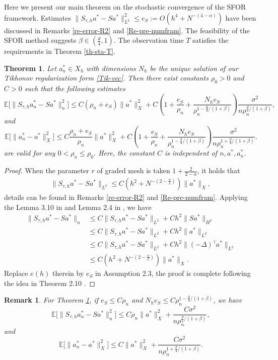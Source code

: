 \documentclass[11pt]{article}
\newtheorem{theorem}{Theorem}
\newtheorem{remark}{Remark}[section]
\numberwithin{equation}{section}
\begin{document}
Here we present our main theorem on the stochastic convergence of the SFOR framework. Estimates $\|S_{\tau,h}a^*-Sa^*\|_{L^2}^2\leq e_S:=O(h^4+N^{-(4-\alpha)})$ have been discussed in Remarks \ref{re-error-R2} and \ref{Re-pre-numfram}. 
The feasibility of the SFOR method suggests $\beta\in(\frac{d}{4},1)$. The observation time $T$ satisfies the requirements in Theorem \ref{th-sta-T}.


\begin{theorem}\label{thm-conv-SFOR}
Let $a_n^* \in X_h$ with dimensions $N_h$ be the unique solution of our Tikhonov regularization form \eqref{Tik-vec}. Then there exist constants $ \rho_0 > 0 $ and $ C > 0 $ such that the following estimates
\[ 
\mathbb{E} \bigl[ \| S_{\tau,h} a_n^* - S a^* \|^2_n \bigr] \leq C(\rho_n+e_S)\| a^* \|^2_X + C\left(1+\frac{e_S}{\rho_n}+\frac{N_he_S}{\rho_n^{1-\frac{d}4/(1+\beta)}}\right)\frac{\sigma^2}{n \rho_n^{\frac{d}4/(1+\beta)}}, 
\]
and
\[ 
\mathbb{E} \bigl[ \| a_n^* - a^* \|^2_{X} \bigr] \leq C\frac{\rho_n+e_S}{\rho_n}\| a^* \|^2_X +C\left(1+\frac{e_S}{\rho_n}+\frac{N_he_S}{\rho_n^{1-\frac{d}4/(1+\beta)}}\right)\frac{\sigma^2}{n \rho_n^{1+\frac{d}4/(1+\beta)}}. 
\]
are valid for any $0< \rho_n \leq \rho_0 $. Here, the constant $C$ is independent of $n,a^*,a_n^*$.
\end{theorem}
\begin{proof}
When the parameter $r$ of graded mesh is taken $1+\frac{2}{2-\alpha}$, it holds that
\begin{align*}
\|S_{\tau,h}a^*-Sa^*\|_{L^2}
\leq C(h^2+N^{-(2-\frac{\alpha}{2})})\|a^*\|_{X},
\end{align*}
details can be found in Remarks \ref{re-error-R2} and \ref{Re-pre-numfram}.
Applying the Lemma 3.10 in \cite{chen2022stochastic} and Lemma 2.4 in \cite{LiZhang2024}, we have
\begin{align*}
\|S_{\tau,h}a^*-Sa^*\|_n
&\leq C\|S_{\tau,h}a^*-Sa^*\|_{L^2}+Ch^2\|Sa^*\|_{H^2}\\
&\leq C\|S_{\tau,h}a^*-Sa^*\|_{L^2}+Ch^2\|a^*\|_{L^2}\\
&\leq C\|S_{\tau,h}a^*-Sa^*\|_{L^2}+Ch^2\|(-\Delta)^{\gamma}a^*\|_{L^2}\\
&\leq C(h^2+N^{-(2-\frac{\alpha}{2})})\|a^*\|_{X}.
\end{align*}
Replace $e(h)$ therein by $e_S$ in Assumption 2.3, the proof is complete following the idea in Theorem 2.10 \cite{chen2022stochastic}.
\end{proof}

\begin{remark}\label{core}
For Theorem \ref{thm-conv-SFOR}, if $e_S\leq C\rho_n$ and $N_he_S\leq C\rho_n^{1-\frac{d}4/(1+\beta)}$, we have
\[ 
\mathbb{E} \bigl[ \| S_{\tau,h} a_n^* - S a^* \|^2_n \bigr] \leq C\rho_n\| a^* \|^2_X + \frac{C\sigma^2}{n \rho_n^{\frac{d}4/(1+\beta)}}, 
\]
and
\[ 
\mathbb{E} \bigl[ \| a_n^* - a^* \|^2_{X} \bigr] \leq C \|a^* \|^2_X +\frac{C\sigma^2}{n \rho_n^{1+\frac{d}4/(1+\beta)}}. 
\]
\end{remark}
\end{document}

